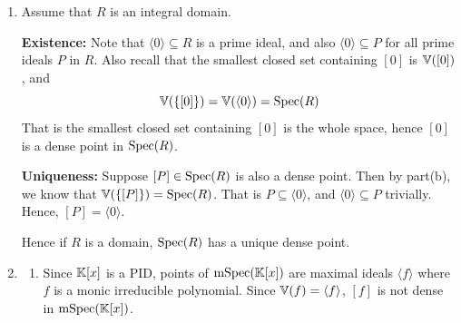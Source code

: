 \documentclass[Notebook.tex]{subfiles}
\begin{document}
\begin{solution}
\begin{enumerate}[label=(\alph*),ref=\theenumi\alph*]
\begin{enumerate}[label=(\roman*), ref=\theenumi\roman*]
            \item $\Spec(\Z/\langle 4\rangle) = \{\langle 2 \rangle\}$. Hence $[2]$ is trivially dense. 

            \item $\Spec(\Z/\langle 12\rangle) = \{\langle 2 \rangle, \langle 3 \rangle \}$. Note that they are both maximal since $\Z/\langle 12\rangle/\langle 2 \rangle = \Z/\langle 2 \rangle$ and $\Z/\langle 12\rangle/\langle 3 \rangle = \Z/\langle 3 \rangle$. 
            
            From part (b) we know that dense points of $\Spec(\Z/\langle 12\rangle)$ are points $[P] \in \Spec(\Z/\langle 12\rangle)$ such that $\V(P) = \Spec(\Z/\langle 12\rangle)$. Since both ideals are maximal and incomparable, $\V([2])$ doesn't contain $[3]$ and $\V([3])$ doesn't contain $[2]$. Hence, there are no dense points in $\Spec(\Z/\langle 12\rangle)$. 

        \end{enumerate}


        \item Assume that $R$ is an integral domain. 
        
        \textbf{Existence:} Note that $\langle 0 \rangle \subseteq R$ is a prime ideal, and also $\langle 0 \rangle \subseteq P$ for all prime ideals $P$ in $R$. Also recall that the smallest closed set containing $[0]$ is $\mathbb V([0])$, and 
        \[\mathbb V(\{[0]\}) = \mathbb V(\langle 0 \rangle) = \operatorname{Spec}(R) \]
        That is the smallest closed set containing $[0]$ is the whole space, hence $[0]$ is a dense point in $\operatorname{Spec}(R)$. 

        \textbf{Uniqueness:} Suppose $[P] \in \operatorname{Spec}(R)$ is also a dense point. Then by part(b), we know that $\mathbb V(\{[P]\}) = \operatorname{Spec}(R)$. That is $P \subseteq \langle 0 \rangle$, and $\langle 0 \rangle \subseteq P$ trivially. Hence, $[P] = \langle 0 \rangle$. 

        Hence if $R$ is a domain, $\operatorname{Spec}(R)$ has a unique dense point. 

        \item 
        
        \begin{enumerate}[label=(\roman*), ref=\theenumi\roman*]
            \item Since $\mathbb K[x]$ is a PID, points of $\operatorname{mSpec}(\mathbb K[x])$ are maximal ideals $\langle f \rangle$ where $f$ is a monic irreducible polynomial. 
            Since $\mathbb V(f) = \langle f \rangle$, $[f]$ is not dense in $\operatorname{mSpec}(\mathbb K[x])$.


\end{enumerate}
\end{enumerate}
\end{solution}
\end{document}
